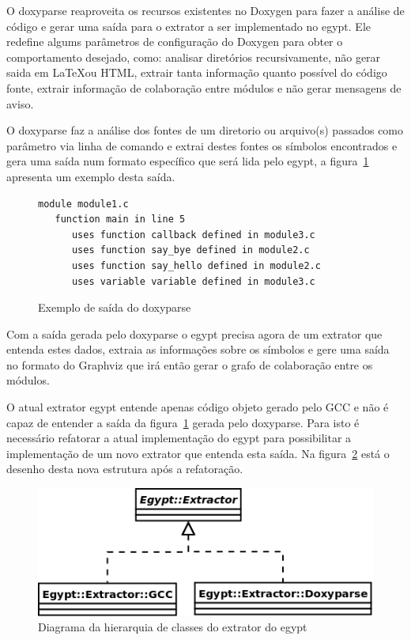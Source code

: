 O doxyparse reaproveita os recursos existentes no Doxygen para fazer a
análise de código e gerar uma saída para o extrator a ser implementado no
egypt. Ele redefine algums parâmetros de configuração do Doxygen para obter o
comportamento desejado, como: analisar diretórios recursivamente, não gerar
saida em \LaTeX ou HTML, extrair tanta informação quanto possível do código
fonte, extrair informação de colaboração entre módulos e não gerar mensagens de
aviso.

O doxyparse faz a análise dos fontes de um diretorio ou arquivo(s)
passados como parâmetro via linha de comando e extrai destes fontes os símbolos
encontrados e gera uma saída num formato específico que será lida pelo egypt, a
figura~\ref{exemplo-saida-doxyparse} apresenta um exemplo desta saída.

\begin{figure}[h]
\begin{Verbatim}[frame=single,fontsize=\relsize{-2},fontfamily=courier]
module module1.c
   function main in line 5
      uses function callback defined in module3.c
      uses function say_bye defined in module2.c
      uses function say_hello defined in module2.c
      uses variable variable defined in module3.c
\end{Verbatim}
\caption{Exemplo de saída do doxyparse}
\label{exemplo-saida-doxyparse}
\end{figure}

Com a saída gerada pelo doxyparse o egypt precisa agora de um extrator que
entenda estes dados, extraia as informações sobre os símbolos e gere uma saída no
formato do Graphviz que irá então gerar o grafo de colaboração entre os módulos.

O atual extrator egypt entende apenas código objeto gerado pelo GCC e não é
capaz de entender a saída da figura~\ref{exemplo-saida-doxyparse} gerada pelo
doxyparse. Para isto é necessário refatorar a atual implementação do egypt para
possibilitar a implementação de um novo extrator que entenda esta saída. Na
figura~\ref{egypt-diagram-extractor} está o desenho desta nova estrutura após a
refatoração.

\begin{figure}[h]
\center
\includegraphics[scale=0.4]{imagens/egypt-diagram-extractor}
\caption{Diagrama da hierarquia de classes do extrator do egypt}
\label{egypt-diagram-extractor}
\end{figure}

